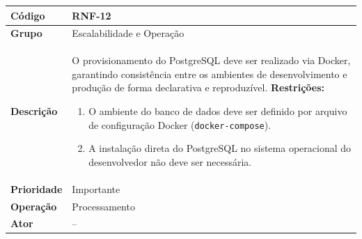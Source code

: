 \FloatBarrier
\begin{quadro}[htb]
  \caption{RNF-12 -- Ambiente de banco de dados reproduzível via Docker}
  \label{quad:rnf12}
  \begin{tabular}{|p{3.2cm}|p{11.8cm}|}
    \hline
    \textbf{Código}     & RNF-12                                                                                        \\ \hline
    \textbf{Grupo}      & Escalabilidade e Operação                                                                     \\ \hline
    \textbf{Descrição}  &
    O provisionamento do PostgreSQL deve ser realizado via Docker, garantindo consistência entre os ambientes de desenvolvimento e produção de forma declarativa e reproduzível.
    \textbf{Restrições:}
    \begin{enumerate}[nosep,leftmargin=1.2em,topsep=2pt,partopsep=0pt,parsep=0pt,itemsep=1pt]
      \item O ambiente do banco de dados deve ser definido por arquivo de configuração Docker (\texttt{docker-compose}).
      \item A instalação direta do PostgreSQL no sistema operacional do desenvolvedor não deve ser necessária.
    \end{enumerate} \\ \hline
    \textbf{Prioridade} & Importante                                                                                    \\ \hline
    \textbf{Operação}   & Processamento                                                                                 \\ \hline
    \textbf{Ator}       & --                                                                                            \\ \hline
  \end{tabular}
\end{quadro}

